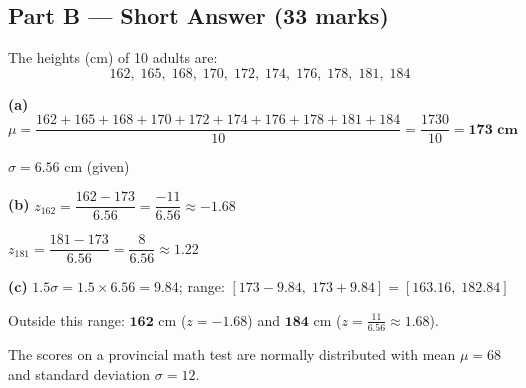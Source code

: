 \documentclass[addpoints]{exam}
\begin{document}
\begin{questions}
\section*{Part B --- Short Answer (33 marks)}

\question[6] The heights (cm) of 10 adults are:
\[162,\; 165,\; 168,\; 170,\; 172,\; 174,\; 176,\; 178,\; 181,\; 184\]
\begin{solution}[9cm]
\textbf{(a)} $\mu = \dfrac{162+165+168+170+172+174+176+178+181+184}{10} = \dfrac{1730}{10} = \mathbf{173 \text{ cm}}$

$\sigma = \mathbf{6.56}$ cm (given)

\textbf{(b)} $z_{162} = \dfrac{162-173}{6.56} = \dfrac{-11}{6.56} \approx \mathbf{-1.68}$

$z_{181} = \dfrac{181-173}{6.56} = \dfrac{8}{6.56} \approx \mathbf{1.22}$

\textbf{(c)} $1.5\sigma = 1.5 \times 6.56 = 9.84$; range: $[173-9.84,\; 173+9.84] = [163.16,\; 182.84]$

Outside this range: $\mathbf{162}$ cm ($z = -1.68$) and $\mathbf{184}$ cm ($z = \frac{11}{6.56} \approx 1.68$).
\end{solution}

\question[6] The scores on a provincial math test are normally distributed with mean $\mu = 68$
and standard deviation $\sigma = 12$.
\end{questions}
\end{document}
